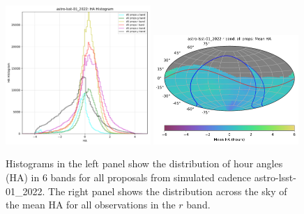 \documentclass[DM,lsstdraft,authoryear,toc]{lsstdoc}
\begin{document}
\begin{figure}[t!]
\includegraphics[width=0.49\textwidth]{figures/astro-lsst-01_2022-ha_hist_per_filter.pdf}
\includegraphics[width=0.49\textwidth]{figures/astro-lsst-01_2022_Mean_HA_r_band_all_props_OPSI_SkyMap.pdf}
\caption{Histograms in the left panel show the distribution of hour angles (HA) in
6 bands for all proposals from simulated cadence astro-lsst-01\_2022.
The right panel shows the distribution across the sky of the mean HA for
all observations in the $r$ band. }
\label{fig:baseline_ha}
\end{figure}
\end{document}
